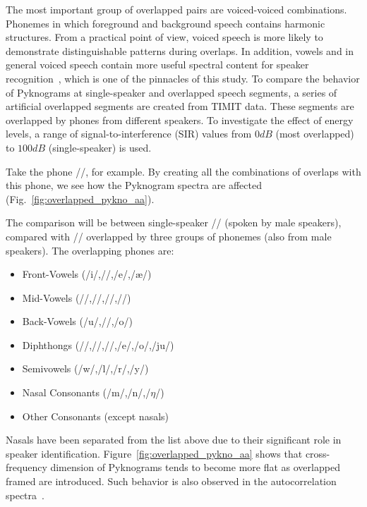 {The most important group of overlapped pairs are voiced-voiced combinations. 
Phonemes in which foreground and background speech contains harmonic structures.
From a practical point of view, voiced speech is more likely to demonstrate distinguishable patterns during overlaps. 
In addition, vowels and in general voiced speech contain more useful spectral content for speaker recognition~\cite{early_speakerid_paper}, which is one of the pinnacles of this study. 
To compare the behavior of Pyknograms at single-speaker and overlapped speech segments, a series of artificial overlapped segments are created from TIMIT data. 
These segments are overlapped by phones from different speakers. 
To investigate the effect of energy levels, a range of signal-to-interference (SIR) values from $0dB$ (most overlapped) to $100dB$ (single-speaker) is used. 

Take the phone /\textscripta/, for example. By creating all the combinations of overlaps with this phone, we  see how the Pyknogram spectra are affected (Fig.~\ref{fig:overlapped_pykno_aa}).

The comparison will be between single-speaker /\textscripta/ (spoken by male speakers), compared with /\textscripta/ overlapped by three groups of phonemes (also from male speakers). 
The overlapping phones are: 
\begin{itemize}
	\item Front-Vowels (/i\textlengthmark/,/\textsci/,/e/,/\ae/)
	\item Mid-Vowels (/\textscripta/,/\textrhookrevepsilon/,/\textturnv/,/\textopeno/)
	\item Back-Vowels (/u/,/\textscu/,/o/)
	\item Diphthongs (/\textscripta\textsci/,/\textopeno\textsci/,/\textscripta\textscu/,/e\textsci/,/o\textscu/,/ju/)
	\item Semivowels (/w/,/l/,/r/,/y/)
	\item Nasal Consonants (/m/,/n/,/$\eta$/)
	\item Other Consonants (except nasals)
\end{itemize}

Nasals have been separated from the list above due to their significant role in speaker identification. Figure~\ref{fig:overlapped_pykno_aa} shows that cross-frequency dimension of Pyknograms tends to become more flat as overlapped framed are introduced. 
Such behavior is also observed in the autocorrelation spectra~\cite{sapvr_paper}. 

 




}

